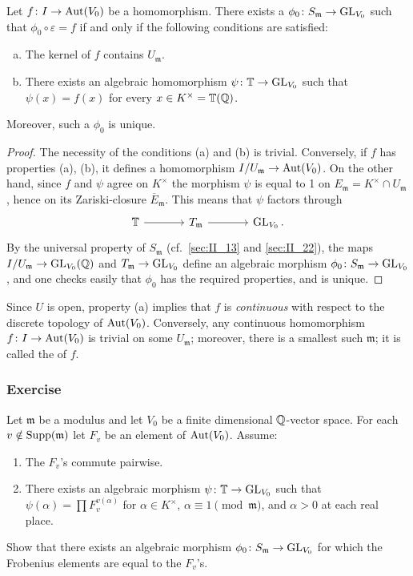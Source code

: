 \begin{prop}
Let $f \colon I \to \operatorname{Aut}(V_0)$ be a homomorphism. There exists a $\phi_0
\colon S_{\mathfrak{m}} \to \operatorname{GL}_{V_0}$ such that $\phi_0 \circ \varepsilon =
f$ if and only if the following conditions are satisfied:
\begin{enumerate}[(a)]
	\item The kernel of $f$ contains $U_{\mathfrak{m}}$.
	\item There exists an algebraic homomorphism $\psi\colon \mathbb{T} \to
		\operatorname{GL}_{V_0}$ such that $\psi(x) = f(x)$ for every $x \in K^\times
		= \mathbb{T}(\mathbb{Q})$.
\end{enumerate}
Moreover, such a $\phi_0$ is unique.
\end{prop}
\begin{proof}
The necessity of the conditions (a) and (b) is trivial. 
Conversely, if $f$ has properties (a), (b), it defines a homomorphism
$I/U_{\mathfrak{m}} \to \operatorname{Aut}(V_0)$. On the other hand, since $f$ and $\psi$ agree on $K^\times$
the morphism $\psi$ is equal to 1 on $E_{\mathfrak{m}} = K^\times \cap U_{\mathfrak{m}}$, hence on its
Zariski-closure $\overline{E}_{\mathfrak{m}}$. This means that $\psi$ factors through
\[\begin{tikzcd}[sep=large]
	\TT \rar & T_{\mathfrak{m}} \rar & \GL_{V_0}.
\end{tikzcd}\]
By the universal property of $S_{\mathfrak{m}}$ (cf.\ \ref{sec:II_13} and
\ref{sec:II_22}), the maps $I/U_{\mathfrak{m}} \to \operatorname{GL}_{V_0}(\mathbb{Q})$ and
$T_{\mathfrak{m}} \to \operatorname{GL}_{V_0}$ define an algebraic morphism $\phi_0 \colon
S_{\mathfrak{m}} \to \operatorname{GL}_{V_0}$, and one checks easily that $\phi_0$ has the
required properties, and is unique.
\end{proof}

\begin{obs}
Since $U$ is open, property (a) implies that $f$ is \emph{continuous} with
\dpage
respect to the discrete topology of $\operatorname{Aut}(V_0)$. Conversely, any continuous
homomorphism $f\colon I \to \operatorname{Aut}(V_0)$ is trivial on some $U_{\mathfrak{m}}$;
moreover, there is a smallest such $\mathfrak{m}$; it is called the
 of $f$.
\end{obs}

\subsubsection*{Exercise}
Let $\mathfrak{m}$ be a modulus and let $V_0$ be a finite dimensional
$\mathbb{Q}$-vector space. For each $v \notin \operatorname{Supp}(\mathfrak{m})$ let $F_v$ be an
element of $\operatorname{Aut}(V_0)$. Assume:
\begin{enumerate}
	\item The $F_v$'s commute pairwise.
	\item There exists an algebraic morphism $\psi\colon \mathbb{T} \to \operatorname{GL}_{V_0}$
		such that $\psi(\alpha) = \prod F_v^{v(\alpha)}$ for $\alpha
		\in K^\times$, $\alpha \equiv 1 \pmod{\mathfrak{m}}$, and
		$\alpha > 0$ at each real place.
\end{enumerate}
Show that there exists an algebraic morphism $\phi_0 \colon S_{\mathfrak{m}}
\to \operatorname{GL}_{V_0}$ for which the Frobenius elements are equal to the $F_v$'s.

